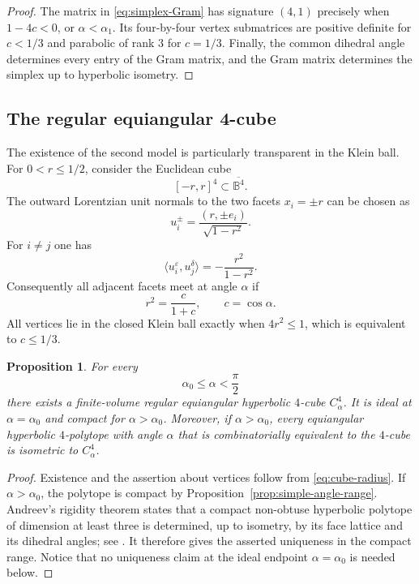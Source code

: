 \documentclass[12pt,a4paper]{article}
\theoremstyle{thmstyleone}
\newtheorem{proposition}[theorem]{Proposition}
\theoremstyle{thmstylethree}
\theoremstyle{thmstyletwo}
\begin{document}
\begin{proof}
The matrix in \eqref{eq:simplex-Gram} has signature $(4,1)$ precisely when
$1-4c<0$, or $\alpha<\alpha_1$.  Its four-by-four vertex submatrices are
positive definite for $c<1/3$ and parabolic of rank $3$ for $c=1/3$.
Finally, the common dihedral angle determines every entry of the Gram matrix,
and the Gram matrix determines the simplex up to hyperbolic isometry.
\end{proof}

\subsection{The regular equiangular 4-cube}

The existence of the second model is particularly transparent in the Klein
ball.  For $0<r\leq1/2$, consider the Euclidean cube
\[
 [-r,r]^4\subset\overline{\mathbb B^4}.
\]
The outward Lorentzian unit normals to the two facets $x_i=\pm r$ can be
chosen as
\[
 u_i^\pm=\frac{(r,\pm e_i)}{\sqrt{1-r^2}}.
\]
For $i\neq j$ one has
\[
 \langle u_i^\varepsilon,u_j^\delta\rangle
 =-\frac{r^2}{1-r^2}.
\]
Consequently all adjacent facets meet at angle $\alpha$ if
\begin{equation}\label{eq:cube-radius}
 r^2=\frac{c}{1+c},
 \qquad c=\cos\alpha.
\end{equation}
All vertices lie in the closed Klein ball exactly when $4r^2\leq1$, which is
equivalent to $c\leq1/3$.

\begin{proposition}\label{prop:cube-existence-uniqueness}
For every
\[
 \alpha_0\leq\alpha<\frac{\pi}{2}
\]
there exists a finite-volume regular equiangular hyperbolic $4$-cube
$C^4_\alpha$.  It is ideal at $\alpha=\alpha_0$ and compact for
$\alpha>\alpha_0$.  Moreover, if $\alpha>\alpha_0$, every equiangular
hyperbolic $4$-polytope with angle $\alpha$ that is combinatorially
equivalent to the $4$-cube is isometric to $C^4_\alpha$.
\end{proposition}

\begin{proof}
Existence and the assertion about vertices follow from
\eqref{eq:cube-radius}.  If $\alpha>\alpha_0$, the polytope is compact by
Proposition~\ref{prop:simple-angle-range}.  Andreev's rigidity theorem states
that a compact non-obtuse hyperbolic polytope of dimension at least three is
determined, up to isometry, by its face lattice and its dihedral angles; see
\cite{Andreev1970Convex}.  It therefore gives the
asserted uniqueness in the compact range.  Notice that no uniqueness claim
at the ideal endpoint $\alpha=\alpha_0$ is needed below.
\end{proof}
\end{document}
